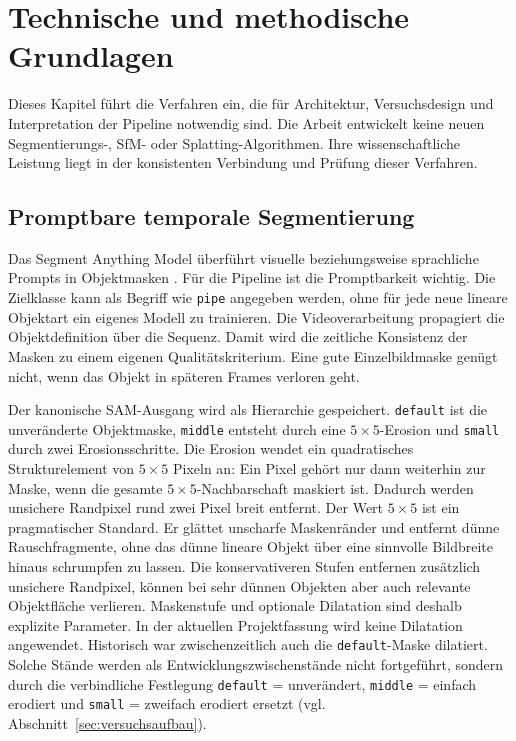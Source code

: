 \section{Technische und methodische Grundlagen}
\label{sec:grundlagen}

Dieses Kapitel führt die Verfahren ein, die für Architektur,
Versuchsdesign und Interpretation der Pipeline notwendig sind. Die Arbeit
entwickelt keine neuen Segmentierungs-, SfM- oder Splatting-Algorithmen. Ihre
wissenschaftliche Leistung liegt in der konsistenten Verbindung und Prüfung
dieser Verfahren.

\subsection{Promptbare temporale Segmentierung}

Das Segment Anything Model überführt visuelle beziehungsweise sprachliche
Prompts in Objektmasken \parencite{kirillov2023segment,metaSam3}. Für die
Pipeline ist die Promptbarkeit wichtig. Die Zielklasse kann als Begriff wie
\texttt{pipe} angegeben werden, ohne für jede neue lineare Objektart ein
eigenes Modell zu trainieren. Die Videoverarbeitung propagiert die
Objektdefinition über die Sequenz. Damit wird die zeitliche Konsistenz der
Masken zu einem eigenen Qualitätskriterium. Eine gute Einzelbildmaske genügt
nicht, wenn das Objekt in späteren Frames verloren geht.

Der kanonische SAM-Ausgang wird als Hierarchie gespeichert. \texttt{default}
ist die unveränderte Objektmaske, \texttt{middle} entsteht durch eine
$5\times5$-Erosion und \texttt{small} durch zwei Erosionsschritte. Die
Erosion wendet ein quadratisches Strukturelement von $5\times5$ Pixeln an:
Ein Pixel gehört nur dann weiterhin zur Maske, wenn die gesamte
$5\times5$-Nachbarschaft maskiert ist. Dadurch werden unsichere Randpixel
rund zwei Pixel breit entfernt. Der Wert $5\times5$ ist ein pragmatischer
Standard. Er glättet unscharfe Maskenränder und entfernt dünne
Rauschfragmente, ohne das dünne lineare Objekt über eine sinnvolle Bildbreite
hinaus schrumpfen zu lassen. Die konservativeren Stufen entfernen zusätzlich
unsichere Randpixel, können bei sehr dünnen Objekten aber auch relevante
Objektfläche verlieren. Maskenstufe und optionale Dilatation sind deshalb
explizite Parameter. In der aktuellen Projektfassung wird keine Dilatation
angewendet. Historisch war zwischenzeitlich auch die \texttt{default}-Maske
dilatiert. Solche Stände werden als Entwicklungszwischenstände nicht
fortgeführt, sondern durch die verbindliche Festlegung
\texttt{default} = unverändert, \texttt{middle} = einfach erodiert und
\texttt{small} = zweifach erodiert ersetzt (vgl. Abschnitt~\ref{sec:versuchsaufbau}).

